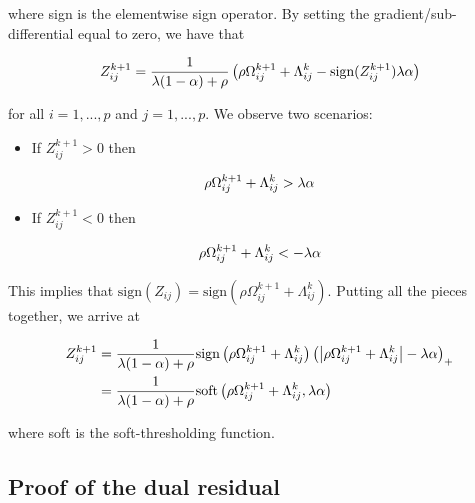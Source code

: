 \documentclass[11pt,]{report}
\providecommand{\tightlist}{%
  \setlength{\itemsep}{0pt}\setlength{\parskip}{0pt}}
\theoremstyle{definition}
\theoremstyle{definition}
\theoremstyle{definition}
\theoremstyle{remark}
\begin{document}
where sign is the elementwise sign operator. By setting the gradient/sub-differential equal to zero, we have that

\begin{equation}
Z_{ij}^{k + 1} = \frac{1}{\lambda(1 - \alpha) + \rho}\left( \rho \Omega_{ij}^{k + 1} + \Lambda_{ij}^{k} - \mbox{sign}(Z_{ij}^{k + 1})\lambda\alpha \right)
\label{eq:ZZsoftproof}\notag
\end{equation}

for all \(i = 1,..., p\) and \(j = 1,..., p\). We observe two scenarios:

\begin{itemize}
\tightlist
\item
  If \(Z_{ij}^{k + 1} > 0\) then
\end{itemize}

\begin{equation}
\rho\Omega_{ij}^{k + 1} + \Lambda_{ij}^{k} > \lambda\alpha \notag
\end{equation}

\begin{itemize}
\tightlist
\item
  If \(Z_{ij}^{k + 1} < 0\) then
\end{itemize}

\begin{equation}
\rho\Omega_{ij}^{k + 1} + \Lambda_{ij}^{k} < -\lambda\alpha \notag
\end{equation}

This implies that \(\mbox{sign}(Z_{ij}) = \mbox{sign}(\rho\Omega_{ij}^{k + 1} + \Lambda_{ij}^{k})\). Putting all the pieces together, we arrive at

\begin{equation}
\begin{split}
Z_{ij}^{k + 1} &= \frac{1}{\lambda(1 - \alpha) + \rho}\mbox{sign}\left(\rho\Omega_{ij}^{k + 1} + \Lambda_{ij}^{k}\right)\left( \left| \rho\Omega_{ij}^{k + 1} + \Lambda_{ij}^{k} \right| - \lambda\alpha \right)_{+} \\
&= \frac{1}{\lambda(1 - \alpha) + \rho}\mbox{soft}\left(\rho\Omega_{ij}^{k + 1} + \Lambda_{ij}^{k}, \lambda\alpha\right)
\label{eq:appendixZZproof}\notag
\end{split}
\end{equation}

where soft is the soft-thresholding function.

\hypertarget{proofdualresidual}{%
\subsection{Proof of the dual residual}\label{proofdualresidual}}
\end{document}

